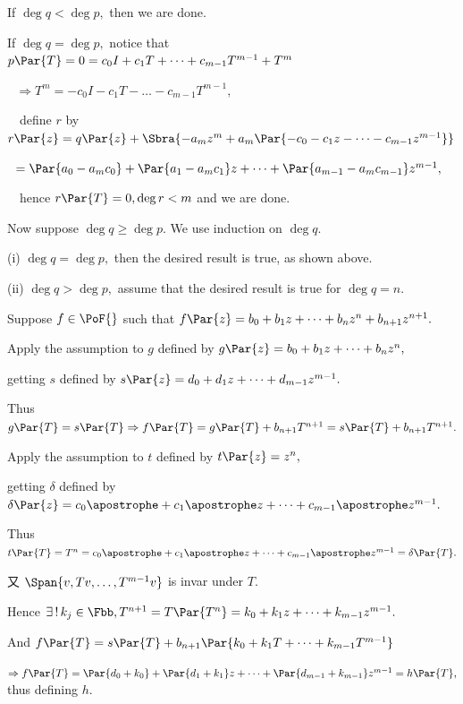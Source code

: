 \par\quad
If $\deg q<\deg p,$ then we are done.\par\quad
If $\deg q=\deg p,$ notice that $p\Par{T}=0=c_0 I+c_1 T+\dots+c_{m-1}T^{m-1}+T^m$\par\qquad\qquad\qquad\qquad\qquad\qquad\quad\,\,
$\Rightarrow T^m=-c_0 I-c_1 T-\dots-c_{m-1}T^{m-1},$\par\qquad\qquad\qquad\quad\,\,\,\,
define $r$ by $r\Par{z}=q\Par{z}+\Sbra{-a_m z^m+a_m\Par{-c_0-c_1 z-\dots-c_{m-1}z^{m-1}}}$\par\qquad\qquad\qquad\qquad\qquad\qquad\qquad\,\,
$=\Par{a_0-a_m c_0}+\Par{a_1-a_m c_1}z+\dots+\Par{a_{m-1}-a_m c_{m-1}}z^{m-1},$\par\qquad\qquad\qquad\quad\,\,\,\,
hence $r\Par{T}=0,\deg r<m$ and we are done.\par\quad
Now suppose $\deg q\geqslant\deg p.$ We use induction on $\deg q.$\par\quad
(i) $\deg q=\deg p,$ then the desired result is true, as shown above.\par\quad\Endi
(ii) $\deg q>\deg p,$ assume that the desired result is true for $\deg q=n.$\par\quad\Hii
Suppose $f\in\PoF{}$ such that $f\Par{z}=b_0 +b_1 z+\dots+b_n z^n+b_{n+1}z^{n+1}.$\par\quad\Hii
Apply the assumption to $g$ defined by $g\Par{z}=b_0 +b_1 z+\dots+b_n z^n,$
\par\quad\Hii\qquad\qquad\qquad\quad getting $s$ defined by $s\Par{z}=d_0+d_1 z+\dots+d_{m-1} z^{m-1}.$\par\quad\Hii
Thus $g\Par{T}=s\Par{T}\Rightarrow f\Par{T}=g\Par{T}+b_{n+1}T^{n+1}=s\Par{T}+b_{n+1}T^{n+1}.$\par\quad\Hii
Apply the assumption to $t$ defined by $t\Par{z}=z^n,$\par\quad\Hii\qquad\qquad\qquad\quad getting $\delta$ defined by $\delta\Par{z}=c_0\apostrophe +c_1\apostrophe z+\dots+c_{m-1}\apostrophe z^{m-1}.$\par\quad\Hii
Thus $t\Par{T}=T^n=c_0\apostrophe+c_1\apostrophe z+\dots+c_{m-1}\apostrophe z^{m-1}=\delta\Par{T}.$\par\quad\Hii
又 $\Span{v,Tv,\dots,T^{m-1}v}$ is invar under $T.$\par\quad\Hii
Hence $\exists\,!\,k_j\in\Fbb,T^{n+1}=T\Par{T^n}=k_0+k_1 z+\dots+k_{m-1}z^{m-1}.$\par\quad\Hii
And $f\Par{T}=s\Par{T}+b_{n+1}\Par{k_0+k_1 T+\dots+k_{m-1}T^{m-1}}$\par\quad\Hii
$\Rightarrow f\Par{T}=\Par{d_0+k_0}+\Par{d_1+k_1}z+\dots+\Par{d_{m-1}+k_{m-1}}z^{m-1}=h\Par{T},$ thus defining $h.$\PfEnd
\SepLine

